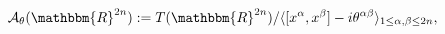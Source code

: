 \begin{equation}\label{nces}
 \mathcal{A}_\theta(\mathbbm{R}^{2n}):=T(\mathbbm{R}^{2n})/
 \langle [x^\alpha,x^\beta]-i\theta^{\alpha\beta}\rangle_
{1\leq\alpha,\beta\leq 2n},
\end{equation}

